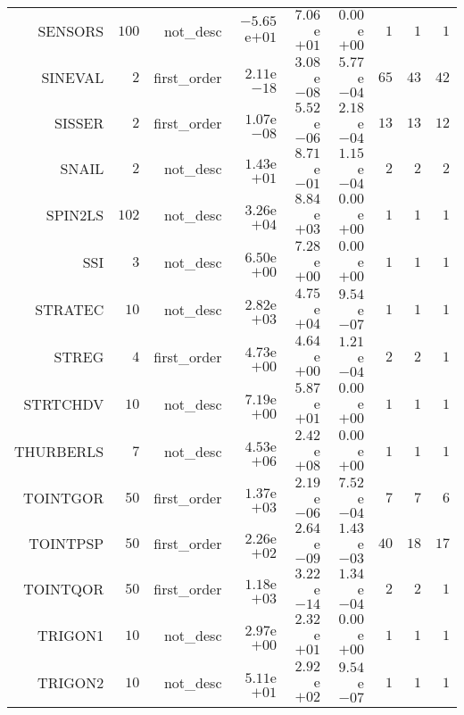 \begin{longtable}{rrrrrrrrr}
SENSORS & \(   100\) & not\_desc & \(-5.65\)e\(+01\) & \( 7.06\)e\(+01\) & \( 0.00\)e\(+00\) & \(     1\) & \(     1\) & \(     1\) \\
SINEVAL & \(     2\) & first\_order & \( 2.11\)e\(-18\) & \( 3.08\)e\(-08\) & \( 5.77\)e\(-04\) & \(    65\) & \(    43\) & \(    42\) \\
SISSER & \(     2\) & first\_order & \( 1.07\)e\(-08\) & \( 5.52\)e\(-06\) & \( 2.18\)e\(-04\) & \(    13\) & \(    13\) & \(    12\) \\
SNAIL & \(     2\) & not\_desc & \( 1.43\)e\(+01\) & \( 8.71\)e\(-01\) & \( 1.15\)e\(-04\) & \(     2\) & \(     2\) & \(     2\) \\
SPIN2LS & \(   102\) & not\_desc & \( 3.26\)e\(+04\) & \( 8.84\)e\(+03\) & \( 0.00\)e\(+00\) & \(     1\) & \(     1\) & \(     1\) \\
SSI & \(     3\) & not\_desc & \( 6.50\)e\(+00\) & \( 7.28\)e\(+00\) & \( 0.00\)e\(+00\) & \(     1\) & \(     1\) & \(     1\) \\
STRATEC & \(    10\) & not\_desc & \( 2.82\)e\(+03\) & \( 4.75\)e\(+04\) & \( 9.54\)e\(-07\) & \(     1\) & \(     1\) & \(     1\) \\
STREG & \(     4\) & first\_order & \( 4.73\)e\(+00\) & \( 4.64\)e\(+00\) & \( 1.21\)e\(-04\) & \(     2\) & \(     2\) & \(     1\) \\
STRTCHDV & \(    10\) & not\_desc & \( 7.19\)e\(+00\) & \( 5.87\)e\(+01\) & \( 0.00\)e\(+00\) & \(     1\) & \(     1\) & \(     1\) \\
THURBERLS & \(     7\) & not\_desc & \( 4.53\)e\(+06\) & \( 2.42\)e\(+08\) & \( 0.00\)e\(+00\) & \(     1\) & \(     1\) & \(     1\) \\
TOINTGOR & \(    50\) & first\_order & \( 1.37\)e\(+03\) & \( 2.19\)e\(-06\) & \( 7.52\)e\(-04\) & \(     7\) & \(     7\) & \(     6\) \\
TOINTPSP & \(    50\) & first\_order & \( 2.26\)e\(+02\) & \( 2.64\)e\(-09\) & \( 1.43\)e\(-03\) & \(    40\) & \(    18\) & \(    17\) \\
TOINTQOR & \(    50\) & first\_order & \( 1.18\)e\(+03\) & \( 3.22\)e\(-14\) & \( 1.34\)e\(-04\) & \(     2\) & \(     2\) & \(     1\) \\
TRIGON1 & \(    10\) & not\_desc & \( 2.97\)e\(+00\) & \( 2.32\)e\(+01\) & \( 0.00\)e\(+00\) & \(     1\) & \(     1\) & \(     1\) \\
TRIGON2 & \(    10\) & not\_desc & \( 5.11\)e\(+01\) & \( 2.92\)e\(+02\) & \( 9.54\)e\(-07\) & \(     1\) & \(     1\) & \(     1\) \\

\end{longtable}

